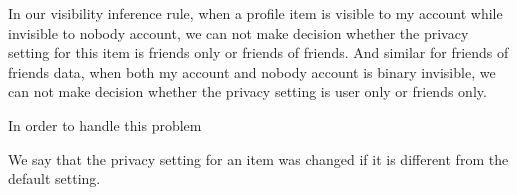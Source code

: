\documentclass[a4paper]{article}
\begin{document}
In our visibility inference rule, when a profile item is visible to my
account while invisible to nobody account, we can not make decision
whether the privacy setting for this item is friends only or friends
of friends. And similar for friends of friends data, when both my
account and nobody account is binary invisible, we can not make
decision whether the privacy setting is user only or friends only. 

In order to handle this problem 

We say that the privacy setting for an item was changed if it is
different from the default setting. 







\end{document}
